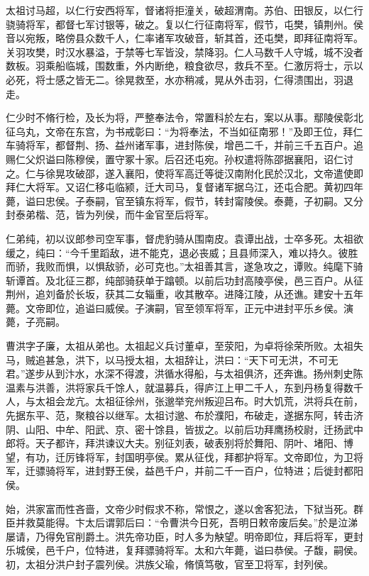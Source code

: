 \documentclass[12pt,UTF8]{ctexbook}
\begin{document}
太祖讨马超，以仁行安西将军，督诸将拒潼关，破超渭南。苏伯、田银反，以仁行骁骑将军，都督七军讨银等，破之。复以仁行征南将军，假节，屯樊，镇荆州。侯音以宛叛，略傍县众数千人，仁率诸军攻破音，斩其首，还屯樊，即拜征南将军。关羽攻樊，时汉水暴溢，于禁等七军皆没，禁降羽。仁人马数千人守城，城不没者数板。羽乘船临城，围数重，外内断绝，粮食欲尽，救兵不至。仁激厉将士，示以必死，将士感之皆无二。徐晃救至，水亦稍减，晃从外击羽，仁得溃围出，羽退走。

仁少时不脩行检，及长为将，严整奉法令，常置科於左右，案以从事。鄢陵侯彰北征乌丸，文帝在东宫，为书戒彰曰：“为将奉法，不当如征南邪！”及即王位，拜仁车骑将军，都督荆、扬、益州诸军事，进封陈侯，增邑二千，并前三千五百户。追赐仁父炽谥曰陈穆侯，置守冢十家。后召还屯宛。孙权遣将陈邵据襄阳，诏仁讨之。仁与徐晃攻破邵，遂入襄阳，使将军高迁等徙汉南附化民於汉北，文帝遣使即拜仁大将军。又诏仁移屯临颍，迁大司马，复督诸军据乌江，还屯合肥。黄初四年薨，谥曰忠侯。子泰嗣，官至镇东将军，假节，转封甯陵侯。泰薨，子初嗣。又分封泰弟楷、范，皆为列侯，而牛金官至后将军。

仁弟纯，初以议郎参司空军事，督虎豹骑从围南皮。袁谭出战，士卒多死。太祖欲缓之，纯曰：“今千里蹈敌，进不能克，退必丧威；且县师深入，难以持久。彼胜而骄，我败而惧，以惧敌骄，必可克也。”太祖善其言，遂急攻之，谭败。纯麾下骑斩谭首。及北征三郡，纯部骑获单于蹹顿。以前后功封高陵亭侯，邑三百户。从征荆州，追刘备於长坂，获其二女辎重，收其散卒。进降江陵，从还谯。建安十五年薨。文帝即位，追谥曰威侯。子演嗣，官至领军将军，正元中进封平乐乡侯。演薨，子亮嗣。

曹洪字子廉，太祖从弟也。太祖起义兵讨董卓，至荥阳，为卓将徐荣所败。太祖失马，贼追甚急，洪下，以马授太祖，太祖辞让，洪曰：“天下可无洪，不可无君。”遂步从到汴水，水深不得渡，洪循水得船，与太祖俱济，还奔谯。扬州刺史陈温素与洪善，洪将家兵千馀人，就温募兵，得庐江上甲二千人，东到丹杨复得数千人，与太祖会龙亢。太祖征徐州，张邈举兖州叛迎吕布。时大饥荒，洪将兵在前，先据东平、范，聚粮谷以继军。太祖讨邈、布於濮阳，布破走，遂据东阿，转击济阴、山阳、中牟、阳武、京、密十馀县，皆拔之。以前后功拜鹰扬校尉，迁扬武中郎将。天子都许，拜洪谏议大夫。别征刘表，破表别将於舞阳、阴叶、堵阳、博望，有功，迁厉锋将军，封国明亭侯。累从征伐，拜都护将军。文帝即位，为卫将军，迁骠骑将军，进封野王侯，益邑千户，并前二千一百户，位特进；后徙封都阳侯。

始，洪家富而性吝啬，文帝少时假求不称，常恨之，遂以舍客犯法，下狱当死。群臣并救莫能得。卞太后谓郭后曰：“令曹洪今日死，吾明日敕帝废后矣。”於是泣涕屡请，乃得免官削爵土。洪先帝功臣，时人多为觖望。明帝即位，拜后将军，更封乐城侯，邑千户，位特进，复拜骠骑将军。太和六年薨，谥曰恭侯。子馥，嗣侯。初，太祖分洪户封子震列侯。洪族父瑜，脩慎笃敬，官至卫将军，封列侯。
\end{document}
